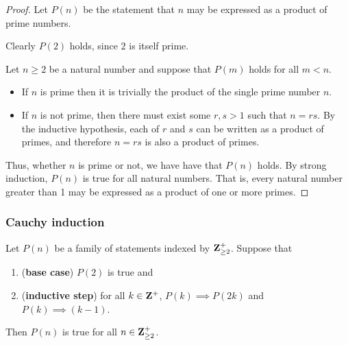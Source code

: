 \begin{proof}
Let $P(n)$ be the statement that $n$ may be expressed as a product of prime numbers. 

Clearly $P(2)$ holds, since $2$ is itself prime. 

Let $n \ge 2$ be a natural number and suppose that $P(m)$ holds for all $m<n$.

\begin{itemize}
\item If $n$ is prime then it is trivially the product of the single prime number $n$. 

\item If $n$ is not prime, then there must exist some $r, s > 1$ such that $n = rs$. By the inductive hypothesis, each of $r$ and $s$ can be written as a product of primes, and therefore $n = rs$ is also a product of primes.
\end{itemize}

Thus, whether $n$ is prime or not, we have have that $P(n)$ holds. By strong induction, $P(n)$ is true for all natural numbers. That is, every natural number greater than 1 may be expressed as a product of one or more primes.
\end{proof}

\subsubsection{Cauchy induction}
\begin{theorem}
Let $P(n)$ be a family of statements indexed by $\mathbf Z^+_{\ge2}$. Suppose that
\begin{enumerate}[label=(\roman*)]
\item (\textbf{base case}) $P(2)$ is true and
\item (\textbf{inductive step}) for all $k\in\mathbf Z^+$, $P(k)\implies P(2k)$ and $P(k)\implies (k-1)$.
\end{enumerate}
Then $P(n)$ is true for all $n\in\mathbf Z^+_{\ge2}$.
\end{theorem}

